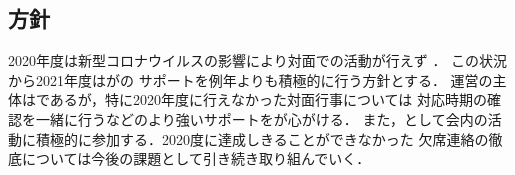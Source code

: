 \subsection*{\newGradeIfKouki{}\thirdGrade{}方針}


2020年度は新型コロナウイルスの影響により対面での活動が行えず
．
この状況から2021年度は\newGradeIfKouki{}\thirdGrade{}が\newGradeIfKouki{}\secondGrade{}の
サポートを例年よりも積極的に行う方針とする．
運営の主体は\newGradeIfKouki{}\secondGrade{}であるが，特に2020年度に行えなかった対面行事については
対応時期の確認を一緒に行うなどのより強いサポートを\newGradeIfKouki{}\thirdGrade{}が心がける．
また，\newGradeIfKouki{}\thirdGrade{}として会内の活動に積極的に参加する．2020度に達成しきることができなかった
欠席連絡の徹底については今後の課題として引き続き取り組んでいく．


